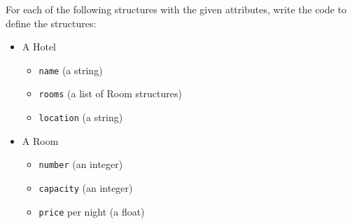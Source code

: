 For each of the following structures with the given attributes,
write the code to define the structures:
\begin{itemize}
	\item A Hotel
	\begin{itemize}
		\item \texttt{name} (a string)
		\item \texttt{rooms} (a list of Room structures)
		\item \texttt{location} (a string)
	\end{itemize}
	\item A Room
	\begin{itemize}
		\item \texttt{number} (an integer)
		\item \texttt{capacity} (an integer)
		\item \texttt{price} per night (a float)
	\end{itemize}
\end{itemize}

\small
\begin{answer}
	
\end{answer}
\normalsize

\vspace{12pt}
